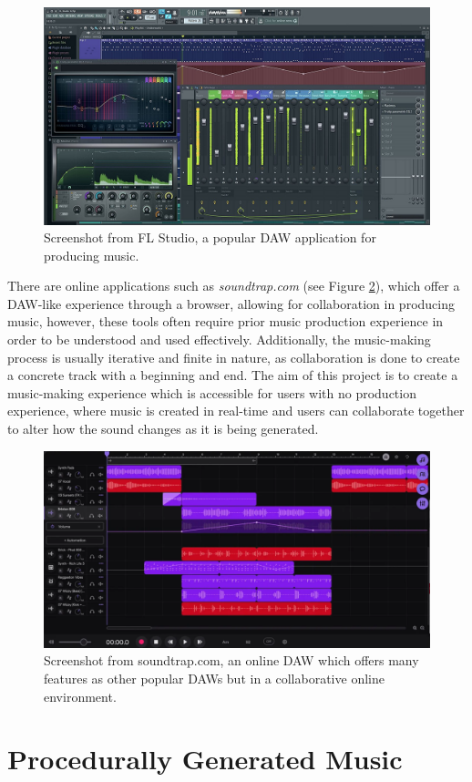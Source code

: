 \begin{figure}[htb]
    \centering
    \includegraphics[width=0.5\linewidth]{images/background/flstudio.jpg}    

    \caption{Screenshot from FL Studio, a popular DAW application for producing music.}

    \label{fig:flstudio}

\end{figure}

There are online applications such as \textit{soundtrap.com} (see Figure \ref{fig:soundtrap}), which offer a DAW-like experience through a browser, allowing for collaboration in producing music, however, these tools often require prior music production experience in order to be understood and used effectively. Additionally, the music-making process is usually iterative and finite in nature, as collaboration is done to create a concrete track with a beginning and end. The aim of this project is to create a music-making experience which is accessible for users with no production experience, where music is created in real-time and users can collaborate together to alter how the sound changes as it is being generated.

\begin{figure}[htb]
    \centering
    \includegraphics[width=0.5\linewidth]{images/background/soundtrap.png}    

    \caption{Screenshot from soundtrap.com, an online DAW which offers many features as other popular DAWs but in a collaborative online environment.}

    \label{fig:soundtrap}

\end{figure}

\section{Procedurally Generated Music}


